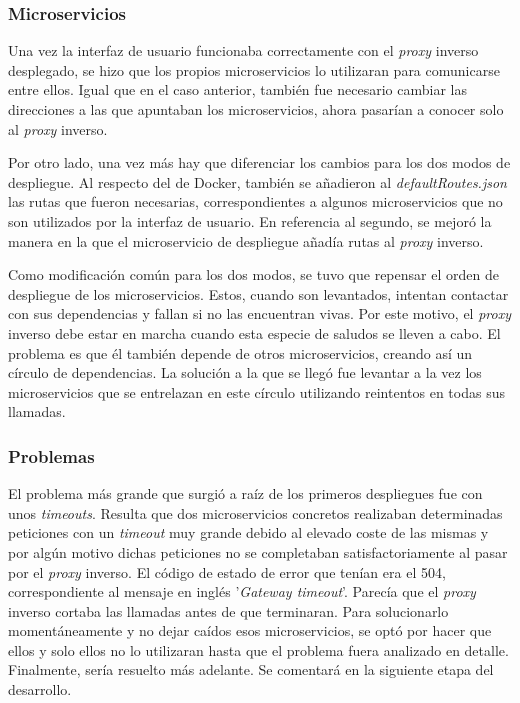 \documentclass[11pt,spanish,listoffigures]{tfgetsinf}
\begin{document}
			\subsubsection{Microservicios}

Una vez la interfaz de usuario funcionaba correctamente con el \emph{proxy} inverso desplegado, se hizo que los propios microservicios lo utilizaran para comunicarse entre ellos. Igual que en el caso anterior, también fue necesario cambiar las direcciones a las que apuntaban los microservicios, ahora pasarían a conocer solo al \emph{proxy} inverso.

Por otro lado, una vez más hay que diferenciar los cambios para los dos modos de despliegue. Al respecto del de Docker, también se añadieron al \emph{defaultRoutes.json} las rutas que fueron necesarias, correspondientes a algunos microservicios que no son utilizados por la interfaz de usuario. En referencia al segundo, se mejoró la manera en la que el microservicio de despliegue añadía rutas al \emph{proxy} inverso.

Como modificación común para los dos modos, se tuvo que repensar el orden de despliegue de los microservicios. Estos, cuando son levantados, intentan contactar con sus dependencias y fallan si no las encuentran vivas. Por este motivo, el \emph{proxy} inverso debe estar en marcha cuando esta especie de saludos se lleven a cabo. El problema es que él también depende de otros microservicios, creando así un círculo de dependencias. La solución a la que se llegó fue levantar a la vez los microservicios que se entrelazan en este círculo utilizando reintentos en todas sus llamadas.


			\subsubsection{Problemas}

El problema más grande que surgió a raíz de los primeros despliegues fue con unos \emph{timeouts}. Resulta que dos microservicios concretos realizaban determinadas peticiones con un \emph{timeout} muy grande debido al elevado coste de las mismas y por algún motivo dichas peticiones no se completaban satisfactoriamente al pasar por el \emph{proxy} inverso. El código de estado de error que tenían era el 504, correspondiente al mensaje en inglés '\emph{Gateway timeout}'. Parecía que el \emph{proxy} inverso cortaba las llamadas antes de que terminaran. Para solucionarlo momentáneamente y no dejar caídos esos microservicios, se optó por hacer que ellos y solo ellos no lo utilizaran hasta que el problema fuera analizado en detalle. Finalmente, sería resuelto más adelante. Se comentará en la siguiente etapa del desarrollo.
\end{document}
